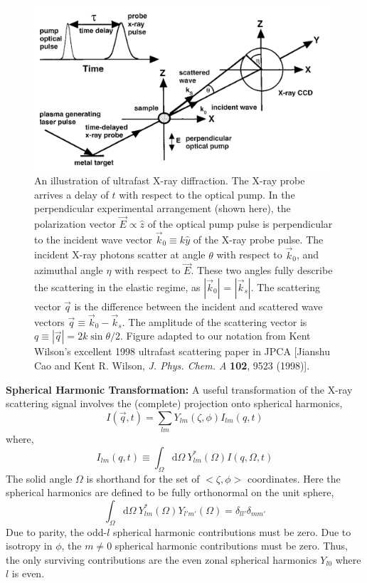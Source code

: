 \documentclass[fleqn,oneside,12pt]{article}
\begin{document}
\begin{figure}[h!]
\begin{center}
\includegraphics[width=11cm]{figures/schem}
\end{center}
\caption{An illustration of ultrafast X-ray diffraction. The X-ray probe arrives
a delay of $t$ with respect to the optical pump. In the perpendicular
experimental arrangement (shown here), the polarization vector $\vec E \propto
\hat z$ of the optical pump pulse is perpendicular to the incident wave vector
$\vec k_0 \equiv k \hat y$ of the X-ray probe pulse. The incident X-ray photons
scatter at angle $\theta$ with respect to $\vec k_0$, and azimuthal angle $\eta$
with respect to $\vec E$. These two angles fully describe the scattering in the
elastic regime, as $|\vec k_0|$ = $|\vec k_s|$. The scattering vector $\vec q$
is the difference between the incident and scattered wave vectors $\vec q \equiv
\vec k_0 - \vec k_s$. The amplitude of the scattering vector is $q \equiv |\vec
q| = 2 k \sin \theta / 2$. Figure adapted to our notation from Kent Wilson's
excellent 1998 ultrafast scattering paper in JPCA [Jianshu Cao and Kent R.
Wilson, \emph{J. Phys. Chem. A} \textbf{102}, 9523 (1998)].}
\label{fig:schem}
\end{figure}

\textbf{Spherical Harmonic Transformation:} A useful transformation of the X-ray
scattering signal involves the (complete) projection onto spherical harmonics,
\[
I (\vec q, t)
=
\sum_{lm}
Y_{lm} (\zeta, \phi)
I_{lm} (q, t)
\]
where,
\[
I_{lm} (q, t)
\equiv
\int_{\Omega}
\mathrm{d} \Omega \
Y_{lm}^{*} (\Omega)
I (q, \Omega, t)
\]
The solid angle $\Omega$ is shorthand for the set of $<\zeta, \phi>$
coordinates.  Here the spherical harmonics are defined to be fully orthonormal
on the unit sphere,
\[
\int_{\Omega}
\mathrm{d} \Omega \
Y_{lm}^{*} (\Omega)
Y_{l'm'} (\Omega)
=
\delta_{ll'}
\delta_{mm'}
\]
Due to parity, the odd-$l$ spherical harmonic contributions must be zero. Due to
isotropy in $\phi$, the $m \neq 0$ spherical harmonic contributions must be
zero. Thus, the only surviving contributions are the even zonal spherical
harmonics $Y_{l0}$ where $l$ is even.
\end{document}
